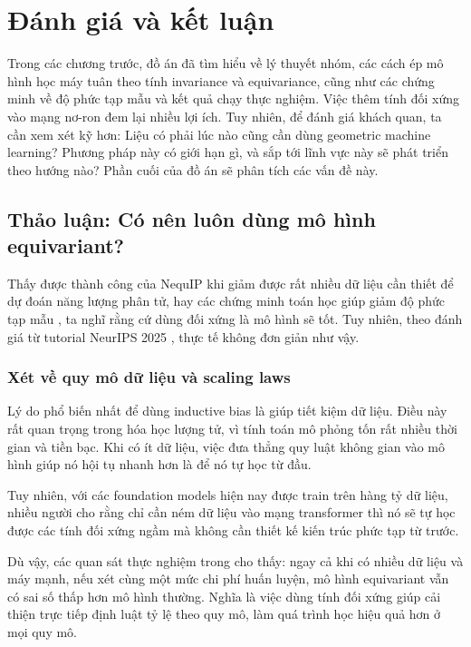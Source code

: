 \section{Đánh giá và kết luận}
\label{sec:danh-gia-ket-luan}

Trong các chương trước, đồ án đã tìm hiểu về lý thuyết nhóm, các cách ép mô hình học máy tuân theo tính invariance và equivariance, cũng như các chứng minh về độ phức tạp mẫu và kết quả chạy thực nghiệm. Việc thêm tính đối xứng vào mạng nơ-ron đem lại nhiều lợi ích. Tuy nhiên, để đánh giá khách quan, ta cần xem xét kỹ hơn: Liệu có phải lúc nào cũng cần dùng geometric machine learning? Phương pháp này có giới hạn gì, và sắp tới lĩnh vực này sẽ phát triển theo hướng nào? Phần cuối của đồ án sẽ phân tích các vấn đề này.

\subsection{Thảo luận: Có nên luôn dùng mô hình equivariant?}
\label{subsec:thao-luan}

Thấy được thành công của NequIP \cite{batzner2022nequip} khi giảm được rất nhiều dữ liệu cần thiết để dự đoán năng lượng phân tử, hay các chứng minh toán học giúp giảm độ phức tạp mẫu \cite{tahmasebi2023exact}, ta nghĩ rằng cứ dùng đối xứng là mô hình sẽ tốt. Tuy nhiên, theo đánh giá từ tutorial NeurIPS 2025 \cite{jegelka2025tutorial}, thực tế không đơn giản như vậy.

\subsubsection{Xét về quy mô dữ liệu và scaling laws}

Lý do phổ biến nhất để dùng inductive bias là giúp tiết kiệm dữ liệu. Điều này rất quan trọng trong hóa học lượng tử, vì tính toán mô phỏng tốn rất nhiều thời gian và tiền bạc. Khi có ít dữ liệu, việc đưa thẳng quy luật không gian vào mô hình giúp nó hội tụ nhanh hơn là để nó tự học từ đầu.

Tuy nhiên, với các foundation models hiện nay được train trên hàng tỷ dữ liệu, nhiều người cho rằng chỉ cần ném dữ liệu vào mạng transformer thì nó sẽ tự học được các tính đối xứng ngầm mà không cần thiết kế kiến trúc phức tạp từ trước. 

Dù vậy, các quan sát thực nghiệm trong \cite{jegelka2025tutorial} cho thấy: ngay cả khi có nhiều dữ liệu và máy mạnh, nếu xét cùng một mức chi phí huấn luyện, mô hình equivariant vẫn có sai số thấp hơn mô hình thường. Nghĩa là việc dùng tính đối xứng giúp cải thiện trực tiếp định luật tỷ lệ theo quy mô, làm quá trình học hiệu quả hơn ở mọi quy mô.


